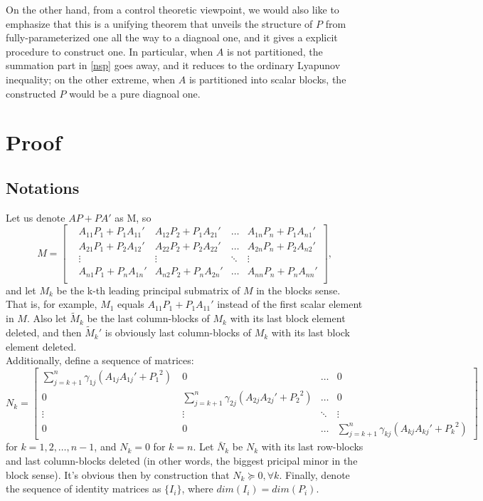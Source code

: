 \documentclass{article}
\begin{document}
On the other hand, from a control theoretic viewpoint, we would also like to emphasize that this is a unifying theorem that unveils the structure of $P$ from fully-parameterized one all the way to a diagnoal one, and it gives a explicit procedure to construct one. In particular, when $A$ is not partitioned, the summation part in \eqref{nsp} goes away, and it reduces to the ordinary Lyapunov inequality; on the other extreme, when $A$ is partitioned into scalar blocks, the constructed $P$ would be a pure diagnoal one. \\



\section{Proof}\label{proof}
\subsection{Notations} %
\label{sub:Notations}
Let us denote $AP+PA'$ as M, so \[
M=\begin{bmatrix}
&A_{11}P_1+P_1A_{11}'&A_{12}P_2+P_1A_{21}'&\dots&A_{1n}P_n+P_1A_{n1}'\\
&A_{21}P_1+P_2A_{12}'&A_{22}P_2+P_2A_{22}'&\dots&A_{2n}P_n+P_2A_{n2}'\\
&\vdots&\vdots&\ddots&\vdots\\
&A_{n1}P_1+P_nA_{1n}'&A_{n2}P_2+P_nA_{2n}'&\dots&A_{nn}P_n+P_nA_{nn}'\\
\end{bmatrix},
\] and let ${M_k}$ be the k-th leading principal submatrix of ${M}$ in the blocks sense. That is, for example, ${M_1}$ equals $A_{11}P_1+P_1A_{11}'$ instead of the first scalar element in $M$. Also let $\tilde M_{k}$ be the last column-blocks of $M_{k}$ with its last block element deleted, and then $\tilde M_{k}'$ is obviously last column-blocks of $M_{k}$ with its last block element deleted.\\

Additionally, define a sequence of matrices:
\[N_k=
\begin{bmatrix}
 \sum\limits_{j=k+1}^{n}\gamma_{1j}(A_{1j}A_{1j}'+{P_1}^2)\ & 0  & \dots  & 0\\
  0 &\sum\limits_{j=k+1}^{n}{}\gamma_{2j}(A_{2j}A_{2j}'+{P_2}^2 )&  \dots  & 0 \\
    \vdots & \vdots  & \ddots & \vdots \\
    0& 0  & \dots  &\sum\limits_{j=k+1}^{n}{}\gamma_{kj}(A_{kj}A_{kj}'+{P_k}^2)
\end{bmatrix}
\]
for $k=1,2,\dots, n-1$, and ${N_k}=0$ for $k=n$. Let $\bar{N}_{k}$ be ${N}_{k}$ with its last row-blocks and last column-blocks deleted (in other words, the biggest pricipal minor in the block sense). It's obvious then by construction that ${N_k}\succeq0, \forall k$. Finally, denote the sequence of identity matrices as $\{I_i\}$, where $dim(I_i)=dim(P_i)$.
\end{document}
